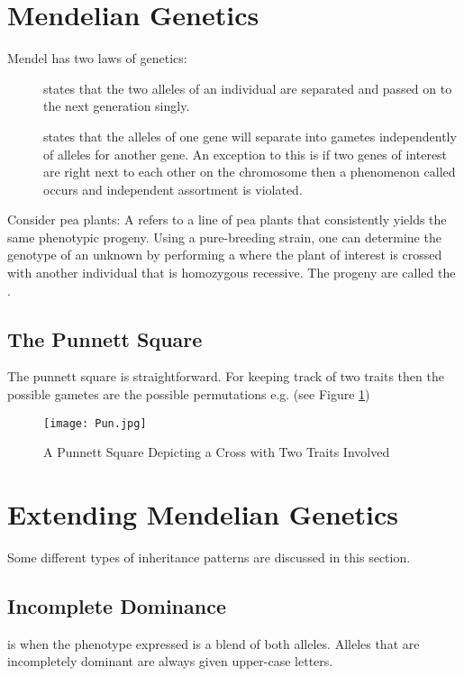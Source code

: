 \documentclass[../Bio_chemistryReview.tex]{subfiles}
\begin{document}
\section{Mendelian Genetics}
Mendel has two laws of genetics:
\begin{infobox}
\begin{description}
  \item [] states that the two alleles of an
    individual are separated and passed on to the next generation singly.
  \item [] states that the alleles of one
    gene will separate into gametes independently of alleles for another gene.
    An exception to this is if two genes of interest are right next to each
    other on the chromosome then a phenomenon called  occurs
    and independent assortment is violated.
\end{description}
\vspace{5pt}
\end{infobox}
Consider pea plants: A  refers to a line of pea
plants that consistently yields the same phenotypic progeny. Using a
pure-breeding strain, one can determine the genotype of an unknown by
performing a  where the plant of interest is crossed with
another individual that is homozygous recessive. The progeny are called the
.

\subsection{The Punnett Square}
The punnett square is straightforward. For keeping track of two traits then the
possible gametes are the possible permutations e.g. (see Figure \ref{fig:Pun})
\begin{figure}[H]
  \centering
  \texttt{[image: Pun.jpg]}
  \caption{A Punnett Square Depicting a Cross with Two Traits Involved}
  \label{fig:Pun}
\end{figure}

\section{Extending Mendelian Genetics}
Some different types of inheritance patterns are discussed in this section.

\subsection{Incomplete Dominance}
 is when the phenotype expressed is a blend of
both alleles. Alleles that are incompletely dominant are always given upper-case
letters.
\end{document}
